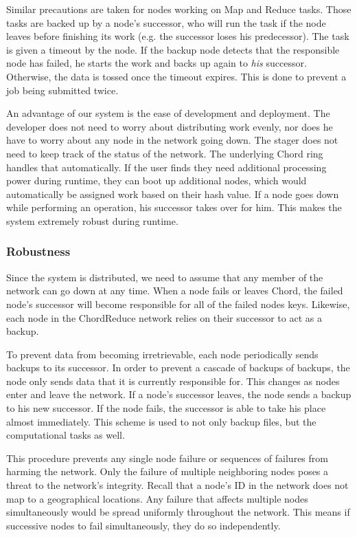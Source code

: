 Similar precautions are taken for nodes working on Map and Reduce tasks.  
Those tasks are backed up by a node's successor, who will run the task if the node leaves before finishing its work (e.g. the successor loses his predecessor).   
The task is given a timeout by the node.  
If the backup node detects that the responsible node has failed, he starts the work and backs up again to \emph{his} successor.  
Otherwise, the data is tossed once the timeout expires.
This is done to prevent a job being submitted twice.

An advantage of our system is the ease of development and deployment.  
The developer does not need to worry about distributing work evenly, nor does he have to worry about any node in the network going down. 
The stager does not need to keep track of the status of the network.  
The underlying Chord ring handles that automatically.  
If the user finds they need additional processing power during runtime, they can boot up additional nodes, which would automatically be assigned work based on their hash value.   
If a node goes down while performing an operation, his successor takes over for him.  
This makes the system extremely robust during runtime.


\subsubsection{Robustness}
Since the system is distributed, we need to assume that any member of the network can go down at any time.
When a node fails or leaves Chord, the failed node's successor will become responsible for all of the failed nodes keys. 
Likewise, each node in the ChordReduce network relies on their successor to act as a backup.

To prevent data from becoming irretrievable, each node periodically sends backups to its successor.  
In order to prevent a cascade of backups of backups, the node only sends data that it is currently responsible for.  
This changes as nodes enter and leave the network.  
If a node's successor leaves, the node sends a backup to his new successor.  
If the node fails, the successor is able to take his place almost immediately.  
This scheme is used to not only backup files, but the computational tasks as well.

This procedure prevents any single node failure or sequences of failures from harming the network. 
Only the failure of multiple neighboring nodes poses a threat to the network's integrity.  
Recall that a node's ID in the network does not map to a geographical locations.
Any failure that affects multiple nodes simultaneously would be spread uniformly throughout the network.
This means if successive nodes to fail simultaneously, they do so independently.

